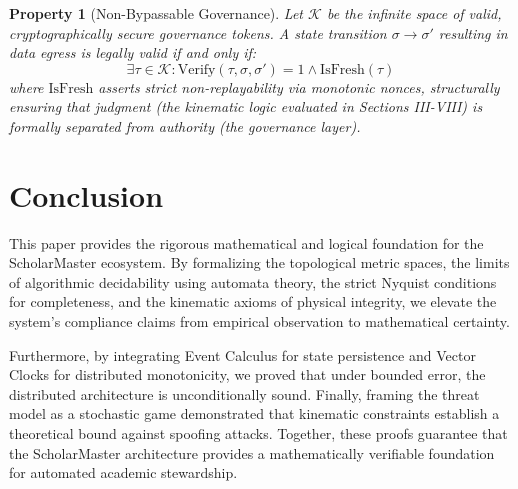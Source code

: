 \documentclass[conference]{IEEEtran}
\newtheorem{property}{Property}
\begin{document}
\begin{property}[Non-Bypassable Governance]
Let $\mathcal{K}$ be the infinite space of valid, cryptographically secure governance tokens. A state transition $\sigma \to \sigma'$ resulting in data egress is legally valid if and only if:
\begin{equation}
\exists \tau \in \mathcal{K} : \text{Verify}(\tau, \sigma, \sigma') = 1 \land \text{IsFresh}(\tau)
\end{equation}
where $\text{IsFresh}$ asserts strict non-replayability via monotonic nonces, structurally ensuring that judgment (the kinematic logic evaluated in Sections III-VIII) is formally separated from authority (the governance layer).
\end{property}

\section{Conclusion}
This paper provides the rigorous mathematical and logical foundation for the ScholarMaster ecosystem. By formalizing the topological metric spaces, the limits of algorithmic decidability using automata theory, the strict Nyquist conditions for completeness, and the kinematic axioms of physical integrity, we elevate the system's compliance claims from empirical observation to mathematical certainty. 

Furthermore, by integrating Event Calculus for state persistence and Vector Clocks for distributed monotonicity, we proved that under bounded error, the distributed architecture is unconditionally sound. Finally, framing the threat model as a stochastic game demonstrated that kinematic constraints establish a theoretical bound against spoofing attacks. Together, these proofs guarantee that the ScholarMaster architecture provides a mathematically verifiable foundation for automated academic stewardship.
\end{document}
